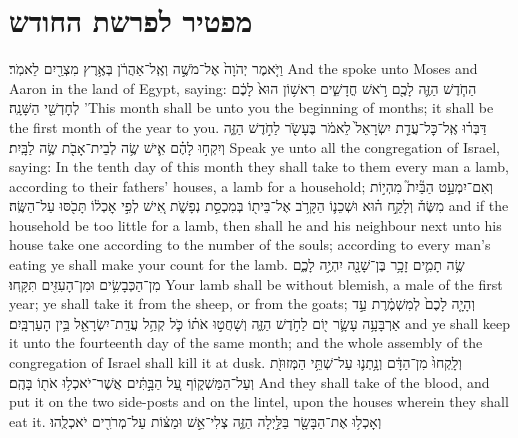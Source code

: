 \documentclass[11pt, openany]{book}
\begin{document}
\section*{מפטיר לפרשת החודש}
\renewcommand{\haftarahname}{מפטיר לפרשת החודש}
\vspace{-12pt}
\nopagebreak
\label{maft_hachodesh}
\setcounter{chap}{12}
\setcounter{verse}{1}
{וַיֹּ֤אמֶר יְהֹוָה֙ אֶל־מֹשֶׁ֣ה וְאֶֽל־אַהֲרֹ֔ן בְּאֶ֥רֶץ מִצְרַ֖יִם לֵאמֹֽר׃}
{And the \lord\space spoke unto Moses and Aaron in the land of Egypt, saying:}
{הַחֹ֧דֶשׁ הַזֶּ֛ה לָכֶ֖ם רֹ֣אשׁ חֳדָשִׁ֑ים רִאשׁ֥וֹן הוּא֙ לָכֶ֔ם לְחׇדְשֵׁ֖י הַשָּׁנָֽה׃}
{’This month shall be unto you the beginning of months; it shall be the first month of the year to you.}
{דַּבְּר֗וּ אֶֽל־כׇּל־עֲדַ֤ת יִשְׂרָאֵל֙ לֵאמֹ֔ר בֶּעָשֹׂ֖ר לַחֹ֣דֶשׁ הַזֶּ֑ה וְיִקְח֣וּ לָהֶ֗ם אִ֛ישׁ שֶׂ֥ה לְבֵית־אָבֹ֖ת שֶׂ֥ה לַבָּֽיִת׃}
{Speak ye unto all the congregation of Israel, saying: In the tenth day of this month they shall take to them every man a lamb, according to their fathers’ houses, a lamb for a household;}
{וְאִם־יִמְעַ֣ט הַבַּ֘יִת֮ מִהְי֣וֹת מִשֶּׂה֒ וְלָקַ֣ח ה֗וּא וּשְׁכֵנ֛וֹ הַקָּרֹ֥ב אֶל־בֵּית֖וֹ בְּמִכְסַ֣ת נְפָשֹׁ֑ת אִ֚ישׁ לְפִ֣י אׇכְל֔וֹ תָּכֹ֖סּוּ עַל־הַשֶּֽׂה׃}
{and if the household be too little for a lamb, then shall he and his neighbour next unto his house take one according to the number of the souls; according to every man’s eating ye shall make your count for the lamb.}
{שֶׂ֥ה תָמִ֛ים זָכָ֥ר בֶּן־שָׁנָ֖ה יִהְיֶ֣ה לָכֶ֑ם מִן־הַכְּבָשִׂ֥ים וּמִן־הָעִזִּ֖ים תִּקָּֽחוּ׃}
{Your lamb shall be without blemish, a male of the first year; ye shall take it from the sheep, or from the goats;}
{וְהָיָ֤ה לָכֶם֙ לְמִשְׁמֶ֔רֶת עַ֣ד אַרְבָּעָ֥ה עָשָׂ֛ר י֖וֹם לַחֹ֣דֶשׁ הַזֶּ֑ה וְשָׁחֲט֣וּ אֹת֗וֹ כֹּ֛ל קְהַ֥ל עֲדַֽת־יִשְׂרָאֵ֖ל בֵּ֥ין הָעַרְבָּֽיִם׃}
{and ye shall keep it unto the fourteenth day of the same month; and the whole assembly of the congregation of Israel shall kill it at dusk.}
{וְלָֽקְחוּ֙ מִן־הַדָּ֔ם וְנָ֥תְנ֛וּ עַל־שְׁתֵּ֥י הַמְּזוּזֹ֖ת וְעַל־הַמַּשְׁק֑וֹף עַ֚ל הַבָּ֣תִּ֔ים אֲשֶׁר־יֹאכְל֥וּ אֹת֖וֹ בָּהֶֽם׃}
{And they shall take of the blood, and put it on the two side-posts and on the lintel, upon the houses wherein they shall eat it.}
{וְאָכְל֥וּ אֶת־הַבָּשָׂ֖ר בַּלַּ֣יְלָה הַזֶּ֑ה צְלִי־אֵ֣שׁ וּמַצּ֔וֹת עַל־מְרֹרִ֖ים יֹאכְלֻֽהוּ׃}
\end{document}
